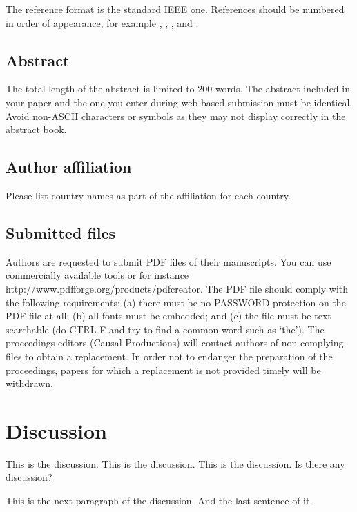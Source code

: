 \documentclass[a4paper]{article}
\begin{document}
      The reference format is the standard IEEE one.
      References should be numbered in order of appearance, for example \cite{Davis80-COP}, \cite{Rabiner89-ATO}, \cite[pp.\ 417--422]{Hastie09-TEO}, and \cite{YourName15-XXX}.

  
    \subsection{Abstract}

      The total length of the abstract is limited to 200 words. 
      The abstract included in your paper and the one you enter during web-based submission must be identical. 
      Avoid non-ASCII characters or symbols as they may not display correctly in the abstract book.

  
    \subsection{Author affiliation}
  
      Please list country names as part of the affiliation for each country.

  
    \subsection{Submitted files}
  
      Authors are requested to submit PDF files of their manuscripts. 
      You can use commercially available tools or for instance http://www.pdfforge.org/products/pdfcreator.
      The PDF file should comply with the following requirements: 
      (a) there must be no PASSWORD protection on the PDF file at all; 
      (b) all fonts must be embedded; and
      (c) the file must be text searchable (do CTRL-F and try to find a common word such as `the').
      The proceedings editors (Causal Productions) will contact authors of non-complying files to obtain a replacement. 
      In order not to endanger the preparation of the proceedings, papers for which a replacement is not provided timely will be withdrawn.


  \section{Discussion}
  
    This is the discussion. 
    This is the discussion. 
    This is the discussion.
    Is there any discussion?

    This is the next paragraph of the discussion. 
    And the last sentence of it.
\end{document}
